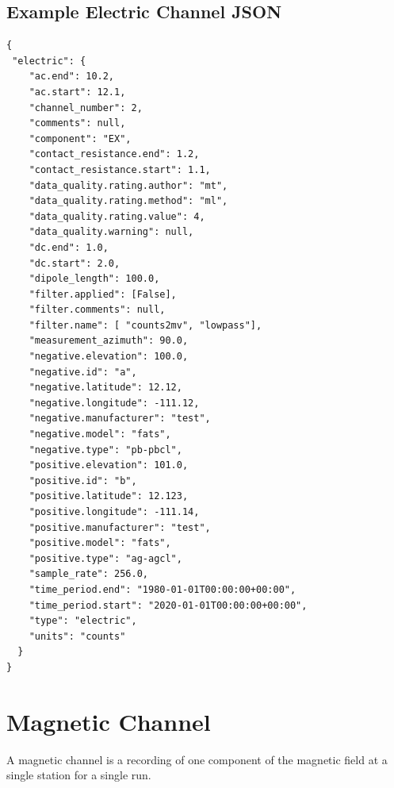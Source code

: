\documentclass{article}
\begin{document}
\clearpage
\newpage
\subsection{Example Electric Channel JSON}

\begin{verbatim}
{
 "electric": {
    "ac.end": 10.2,
    "ac.start": 12.1,
    "channel_number": 2,
    "comments": null,
    "component": "EX",
    "contact_resistance.end": 1.2,
    "contact_resistance.start": 1.1,
    "data_quality.rating.author": "mt",
    "data_quality.rating.method": "ml",
    "data_quality.rating.value": 4,
    "data_quality.warning": null,
    "dc.end": 1.0,
    "dc.start": 2.0,
    "dipole_length": 100.0,
    "filter.applied": [False],
    "filter.comments": null,
    "filter.name": [ "counts2mv", "lowpass"],
    "measurement_azimuth": 90.0,
    "negative.elevation": 100.0,
    "negative.id": "a",
    "negative.latitude": 12.12,
    "negative.longitude": -111.12,
    "negative.manufacturer": "test",
    "negative.model": "fats",
    "negative.type": "pb-pbcl",
    "positive.elevation": 101.0,
    "positive.id": "b",
    "positive.latitude": 12.123,
    "positive.longitude": -111.14,
    "positive.manufacturer": "test",
    "positive.model": "fats",
    "positive.type": "ag-agcl",
    "sample_rate": 256.0,
    "time_period.end": "1980-01-01T00:00:00+00:00",
    "time_period.start": "2020-01-01T00:00:00+00:00",
    "type": "electric",
    "units": "counts"
  }
}
\end{verbatim}

\clearpage
\newpage
\section{Magnetic Channel}

A magnetic channel is a recording of one component of the magnetic field at a single station for a single run.
\end{document}
